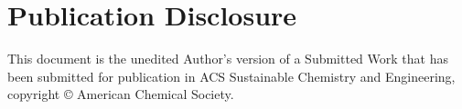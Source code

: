 \documentclass[journal=ascecg,manuscript=article,articletitle=true]{achemso}
\begin{document}
\section{Publication Disclosure}
This document is the unedited Author's version of a Submitted Work that has been submitted for publication in ACS Sustainable Chemistry and Engineering, copyright © American Chemical Society.





\end{document}
